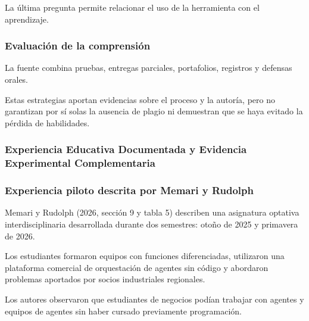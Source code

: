 La última pregunta permite relacionar el uso de la herramienta con el aprendizaje. %

\subsubsection*{Evaluación de la comprensión} %

La fuente combina pruebas, entregas parciales, portafolios, registros y defensas orales. %

Estas estrategias aportan evidencias sobre el proceso y la autoría, pero no garantizan por sí solas la ausencia de plagio ni demuestran que se haya evitado la pérdida de habilidades. %

\subsubsection{Experiencia Educativa Documentada y Evidencia Experimental Complementaria} %

\subsubsection*{Experiencia piloto descrita por Memari y Rudolph} %

Memari y Rudolph (2026, sección 9 y tabla 5) describen una asignatura optativa interdisciplinaria desarrollada durante dos semestres: otoño de 2025 y primavera de 2026. %

Los estudiantes formaron equipos con funciones diferenciadas, utilizaron una plataforma comercial de orquestación de agentes sin código y abordaron problemas aportados por socios industriales regionales. %

Los autores observaron que estudiantes de negocios podían trabajar con agentes y equipos de agentes sin haber cursado previamente programación. %

